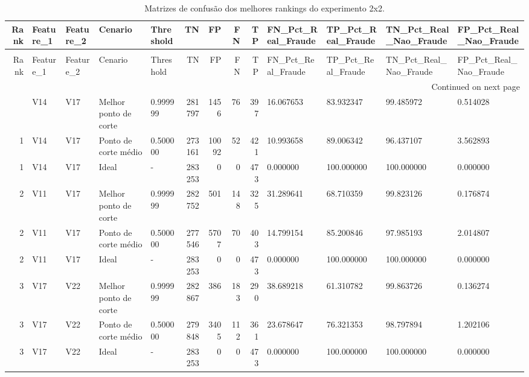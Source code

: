 \begin{longtable}{rllllrrrrllll}
\caption{Matrizes de confusão dos melhores rankings do experimento 2x2.} \label{tab:matrizes-confusao-ranks-2x2} \\
\toprule
Rank & Feature\_1 & Feature\_2 & Cenario & Threshold & TN & FP & FN & TP & FN\_Pct\_Real\_Fraude & TP\_Pct\_Real\_Fraude & TN\_Pct\_Real\_Nao\_Fraude & FP\_Pct\_Real\_Nao\_Fraude \\
\midrule
\endfirsthead
\caption[]{Matrizes de confusão dos melhores rankings do experimento 2x2.} \\
\toprule
Rank & Feature\_1 & Feature\_2 & Cenario & Threshold & TN & FP & FN & TP & FN\_Pct\_Real\_Fraude & TP\_Pct\_Real\_Fraude & TN\_Pct\_Real\_Nao\_Fraude & FP\_Pct\_Real\_Nao\_Fraude \\
\midrule
\endhead
\midrule
\multicolumn{13}{r}{Continued on next page} \\
\midrule
\endfoot
\bottomrule
\endlastfoot
1 & V14 & V17 & Melhor ponto de corte & 0.999999 & 281797 & 1456 & 76 & 397 & 16.067653 & 83.932347 & 99.485972 & 0.514028 \\
1 & V14 & V17 & Ponto de corte médio & 0.500000 & 273161 & 10092 & 52 & 421 & 10.993658 & 89.006342 & 96.437107 & 3.562893 \\
1 & V14 & V17 & Ideal & - & 283253 & 0 & 0 & 473 & 0.000000 & 100.000000 & 100.000000 & 0.000000 \\
2 & V11 & V17 & Melhor ponto de corte & 0.999999 & 282752 & 501 & 148 & 325 & 31.289641 & 68.710359 & 99.823126 & 0.176874 \\
2 & V11 & V17 & Ponto de corte médio & 0.500000 & 277546 & 5707 & 70 & 403 & 14.799154 & 85.200846 & 97.985193 & 2.014807 \\
2 & V11 & V17 & Ideal & - & 283253 & 0 & 0 & 473 & 0.000000 & 100.000000 & 100.000000 & 0.000000 \\
3 & V17 & V22 & Melhor ponto de corte & 0.999999 & 282867 & 386 & 183 & 290 & 38.689218 & 61.310782 & 99.863726 & 0.136274 \\
3 & V17 & V22 & Ponto de corte médio & 0.500000 & 279848 & 3405 & 112 & 361 & 23.678647 & 76.321353 & 98.797894 & 1.202106 \\
3 & V17 & V22 & Ideal & - & 283253 & 0 & 0 & 473 & 0.000000 & 100.000000 & 100.000000 & 0.000000 \\
\end{longtable}
